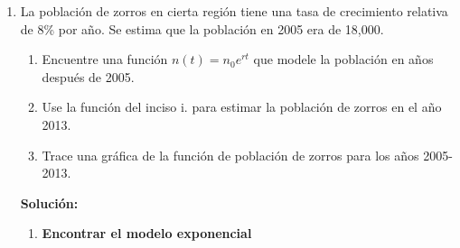 \documentclass[12pt]{article}
\begin{document}
\begin{enumerate}[label=\alph*.-]
\begin{enumerate}[label=\roman*.]
        Por lo tanto:
        \[n(35) = 10 \cdot 2^{23.33}\]
        
        Calculamos $2^{23.33}$:
        \[2^{23.33} \approx 10,321,285\]
        
        \[n(35) = 10 \cdot 10,321,285 \approx 103,212,850 \text{ bacterias}\]
        
        \[\boxed{n(35) \approx 103,212,850 \text{ bacterias}}\]
        
        \item \textbf{Tiempo para llegar a 10,000 bacterias}

        Planteamos:
        \[10,000 = 10 \cdot 2^{t/1.5}\]

        Dividimos entre 10:
        \[1,000 = 2^{t/1.5}\]

        Aplicamos logaritmo natural en ambos lados:
        \[\ln(1,000) = \ln\left(2^{t/1.5}\right)\]

        Usando la propiedad $\ln(a^b) = b \ln(a)$:
        \[\ln(1,000) = \frac{t}{1.5} \ln(2)\]

        Despejamos $t$:
        \[t = \frac{1.5 \ln(1,000)}{\ln(2)}\]

        Calculamos:
        \[\ln(1,000) \approx 6.907\]
        \[\ln(2) \approx 0.693\]

        \[t = \frac{1.5 \cdot 6.907}{0.693} \approx 14.95 \text{ horas}\]

        \[\boxed{t \approx 15 \text{ horas}}\]
        
    \end{enumerate}
    
    \newpage
    
    \item La población de zorros en cierta región tiene una tasa de crecimiento relativa de 8\% por año. Se estima que la población en 2005 era de 18,000.
    \begin{enumerate}[label=\roman*.]
        \item Encuentre una función $n(t) = n_0 e^{rt}$ que modele la población en años después de 2005.
        \item Use la función del inciso i. para estimar la población de zorros en el año 2013.
        \item Trace una gráfica de la función de población de zorros para los años 2005-2013.
    \end{enumerate}
    
    \textbf{Solución:}
    
    \begin{enumerate}[label=\roman*.]
        \item \textbf{Encontrar el modelo exponencial}
        

\end{enumerate}
\end{enumerate}
\end{document}

